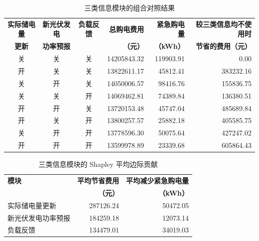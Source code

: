 \documentclass[12pt,a4paper]{ctexart}
\renewcommand{\textbf}[1]{{\CJKfamily{heiti}\bfseries #1}}
\begin{document}
\begin{table}[htbp]
\centering
\footnotesize
\setlength{\tabcolsep}{4pt}
\caption{三类信息模块的组合对照结果}
\label{tab:q3-information-ablation}
\renewcommand{\arraystretch}{1.15}
\begin{tabular}{ccc r r r}
\toprule
\textbf{实际储电量} & \textbf{新光伏发电} & \textbf{负载反馈} & \textbf{总购电费用} & \textbf{紧急购电量} & \textbf{较三类信息均不使用时} \\
\textbf{更新} & \textbf{功率预报} & & \textbf{（元）} & \textbf{（kWh）} & \textbf{节省的费用（元）} \\
\midrule
关 & 关 & 关 & 14205843.32 & 119903.91 & 0.00 \\
开 & 关 & 关 & 13822611.17 & 45812.41 & 383232.16 \\
关 & 开 & 关 & 14050006.57 & 98416.76 & 155836.75 \\
关 & 关 & 开 & 14069462.81 & 74389.84 & 136380.51 \\
开 & 开 & 关 & 13720153.48 & 45747.04 & 485689.84 \\
开 & 关 & 开 & 13800257.57 & 25882.18 & 405585.75 \\
关 & 开 & 开 & 13778596.30 & 50075.64 & 427247.02 \\
开 & 开 & 开 & 13599978.89 & 23339.68 & 605864.43 \\
\bottomrule
\end{tabular}
\end{table}

\begin{table}[htbp]
\centering
\footnotesize
\setlength{\tabcolsep}{4pt}
\caption{三类信息模块的 Shapley 平均边际贡献}
\label{tab:q3-information-shapley}
\renewcommand{\arraystretch}{1.15}
\begin{tabular}{lrr}
\toprule
\textbf{模块} & \textbf{平均节省费用} & \textbf{平均减少紧急购电量} \\
& \textbf{（元）} & \textbf{（kWh）} \\
\midrule
实际储电量更新 & 287126.24 & 50472.05 \\
新光伏发电功率预报 & 184259.18 & 12073.14 \\
负载反馈 & 134479.01 & 34019.03 \\
\bottomrule
\end{tabular}
\end{table}
\end{document}
